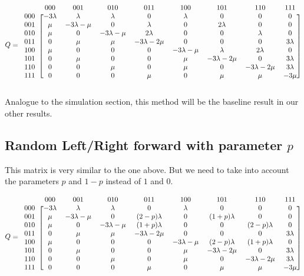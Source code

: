 \documentclass[10pt,a4paper,titlepage]{article}
\begin{document}
\[ Q =
  \begin{blockarray}{ccccccccc}
    & 000 & 001 & 010 & 011 & 100 & 101 & 110 & 111 \\
    \begin{block}{c[cccccccc]}
    000 & -3 \lambda & \lambda & \lambda & 0 & \lambda & 0 & 0 & 0 \\
    001 & \mu & -3\lambda-\mu & 0 & \lambda & 0 & 2\lambda & 0 & 0 \\
    010 & \mu & 0 & -3\lambda-\mu & 2\lambda & 0 & 0 & \lambda & 0 \\
    011 & 0 & \mu & \mu & -3\lambda-2\mu & 0 & 0 & 0 & 3\lambda \\
    100 & \mu & 0 & 0 & 0 & -3\lambda-\mu & \lambda & 2\lambda & 0 \\
    101 & 0 & \mu & 0 & 0 & \mu & -3\lambda-2\mu & 0 & 3\lambda \\
    110 & 0 & 0 & \mu & 0 & \mu & 0 & -3\lambda-2\mu & 3\lambda \\
    111 & 0 & 0 & 0 & \mu & 0 & \mu & \mu & -3\mu \\
    \end{block}
  \end{blockarray}
\]


Analogue to the simulation section, this method will be the baseline result in our other results.

\subsection{Random Left/Right forward with parameter $p$}
This matrix is very similar to the one above. But we need to take into account the parameters $p$ and $1-p$ instead of $1$ and $0$.

\[ Q =
  \begin{blockarray}{ccccccccc}
    & 000 & 001 & 010 & 011 & 100 & 101 & 110 & 111 \\
    \begin{block}{c[cccccccc]}
    000 & -3 \lambda & \lambda & \lambda & 0 & \lambda & 0 & 0 & 0 \\
    001 & \mu & -3\lambda-\mu & 0 & (2-p)\lambda & 0 & (1+p)\lambda & 0 & 0 \\
    010 & \mu & 0 & -3\lambda-\mu & (1+p)\lambda & 0 & 0 & (2-p)\lambda & 0 \\
    011 & 0 & \mu & \mu & -3\lambda-2\mu & 0 & 0 & 0 & 3\lambda \\
    100 & \mu & 0 & 0 & 0 & -3\lambda-\mu & (2-p)\lambda & (1+p)\lambda & 0 \\
    101 & 0 & \mu & 0 & 0 & \mu & -3\lambda-2\mu & 0 & 3\lambda \\
    110 & 0 & 0 & \mu & 0 & \mu & 0 & -3\lambda-2\mu & 3\lambda \\
    111 & 0 & 0 & 0 & \mu & 0 & \mu & \mu & -3\mu \\
    \end{block}
  \end{blockarray}
\]
\end{document}
